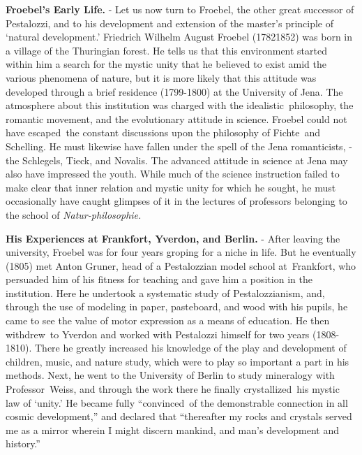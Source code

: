 \documentclass[]{book}
\begin{document}
\textbf{Froebel's Early Life.} - Let us now turn to Froebel, the other great successor of Pestalozzi, and to his development and extension of the master's principle of `natural development.' Friedrich Wilhelm August Froebel (17821852) was born in a village of the Thuringian forest. He tells us that this environment started within him a search for the mystic unity that he believed to exist amid the various phenomena of nature, but it is more likely that this attitude was developed through a brief residence (1799-1800) at the University of Jena. The atmosphere about this institution was charged with the idealistic~philosophy, the romantic movement, and the evolutionary attitude in science. Froebel could not have escaped~the constant discussions upon the philosophy of Fichte~and Schelling. He must likewise have fallen under the spell of the Jena romanticists, - the Schlegels, Tieck, and Novalis. The advanced attitude in science at Jena may also have impressed the youth. While much of the science instruction failed to make clear that inner relation and mystic unity for which he sought, he must occasionally have caught glimpses of it in the lectures of professors belonging to the school of \emph{Natur-philosophie.}

\textbf{His Experiences at Frankfort, Yverdon, and Berlin.} - After leaving the university, Froebel was for four years groping for a niche in life. But he eventually (1805) met Anton Gruner, head of a Pestalozzian model school at~Frankfort, who persuaded him of his fitness for teaching and gave him a position in the institution. Here he undertook a systematic study of Pestalozzianism, and, through the use of modeling in paper, pasteboard, and wood with his pupils, he came to see the value of motor expression as a means of education. He then withdrew~to Yverdon and worked with Pestalozzi himself for two years (1808-1810). There he greatly increased his knowledge of the play and development of children, music, and nature study, which were to play so important a part in his methods. Next, he went to the University of Berlin to study mineralogy with Professor~Weiss, and through the work there he finally crystallized~his mystic law of `unity.' He became fully ``convinced~of the demonstrable connection in all cosmic development,'' and declared that ``thereafter my rocks and crystals served me as a mirror wherein I might discern mankind, and man's development and history.''
\end{document}
